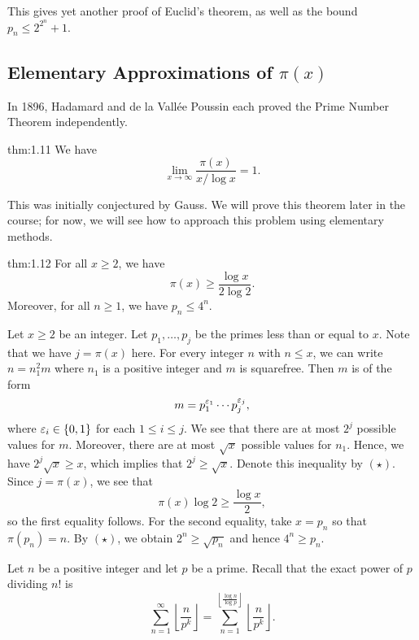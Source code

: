 This gives yet another proof of Euclid's theorem, as well as the bound $p_n \leq 2^{2^n} + 1$. 

\subsection{Elementary Approximations of $\pi(x)$}\label{subsec:1.2}
In 1896, Hadamard and de la Vall\'ee Poussin each proved the Prime Number Theorem independently. 

\begin{theo}{thm:1.11}
We have 
\[ \lim_{x\to\infty} \frac{\pi(x)}{x/\log x} = 1. \]
\end{theo}

This was initially conjectured by Gauss. We will prove this theorem later in the course; 
for now, we will see how to approach this problem using elementary methods. 

\begin{theo}{thm:1.12}
For all $x \geq 2$, we have 
\[ \pi(x) \geq \frac{\log x}{2\log 2}. \]
Moreover, for all $n \geq 1$, we have $p_n \leq 4^n$.
\end{theo}
\begin{pf}
Let $x \geq 2$ be an integer. Let $p_1, \dots, p_j$ be the primes less than or equal to $x$. 
Note that we have $j = \pi(x)$ here. For every integer $n$ with $n \leq x$, we can write $n = n_1^2m$
where $n_1$ is a positive integer and $m$ is squarefree. Then $m$ is of the form 
\[ m = p_1^{\varepsilon_1} \cdots p_j^{\varepsilon_j}, \]
where $\varepsilon_i \in \{0, 1\}$ for each $1 \leq i \leq j$. We see that there are at most $2^j$ possible 
values for $m$. Moreover, there are at most $\sqrt{x}$ possible values for $n_1$. Hence, we have 
$2^j \sqrt{x} \geq x$, which implies that $2^j \geq \sqrt{x}$. Denote this inequality by $(\star)$. 
Since $j = \pi(x)$, we see that 
\[ \pi(x) \log 2 \geq \frac{\log x}2, \]
so the first equality follows. For the second equality, take $x = p_n$ so that $\pi(p_n) = n$. 
By $(\star)$, we obtain $2^n \geq \sqrt{p_n}$ and hence $4^n \geq p_n$. 
\end{pf}

Let $n$ be a positive integer and let $p$ be a prime. Recall that the exact power of $p$ 
dividing $n!$ is 
\[ \sum_{n=1}^\infty \left\lfloor \frac{n}{p^k} \right\rfloor = \sum_{n=1}^{\left\lfloor \frac{\log n}{\log p} \right\rfloor} \left\lfloor \frac{n}{p^k} \right\rfloor. \]

